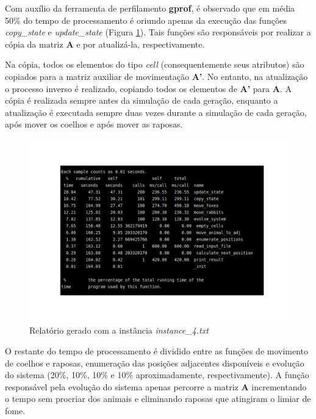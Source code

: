 \documentclass[a4paper, 12pt]{article}
\begin{document}
Com auxílio da ferramenta de perfilamento \textbf{gprof}\footnotemark, é observado que em média 50\% do tempo de processamento é oriundo apenas da execução das funções \emph{copy\_state} e \emph{update\_state} (Figura \ref{fig:map7}). Tais funções são responsáveis por realizar a cópia da matriz \textbf{A} e por atualizá-la, respectivamente.


Na cópia, todos os elementos do tipo \emph{cell} (consequentemente seus atributos) são copiados para a matriz auxiliar de movimentação \textbf{A'}. No entanto, na atualização o processo inverso é realizado, copiando todos os elementos de \textbf{A'} para \textbf{A}. A cópia é realizada sempre antes da simulação de cada geração, enquanto a atualização é executada sempre duas vezes durante a simulação de cada geração, após mover os coelhos e após mover as raposas.

\vspace*{-1.5cm}
\begin{figure}[H]
    \centering
    \includegraphics[width=1.1\textwidth]{Images/gprof.pdf}
    \vspace*{-1.5cm}
    \caption{Relatório gerado com a instância \emph{instance\_4.txt}}
    \label{fig:map7}
\end{figure}

O restante do tempo de processamento é dividido entre as funções de movimento de coelhos e raposas, enumeração das posições adjacentes disponíveis e evolução do sistema (20\%, 10\%, 10\% e 10\% aproximadamente, respectivamente). A função responsável pela evolução do sistema apenas percorre a matriz \textbf{A} incrementando o tempo sem procriar dos animais e eliminando raposas que atingiram o limiar de fome.
\end{document}
